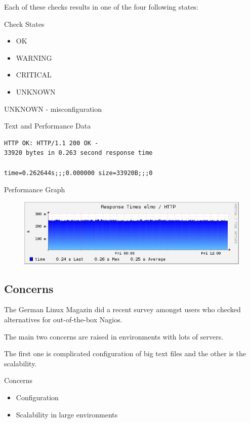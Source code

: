 Each of these checks results in one of the four
following states:

\begin{frame}[fragile]{Check States}

\begin{itemize}
\item OK
\item WARNING 
\item CRITICAL
\item UNKNOWN
\end{itemize}
\end{frame}

UNKNOWN - misconfiguration

\begin{frame}[fragile]{Text and Performance Data}
\begin{lstlisting}
HTTP OK: HTTP/1.1 200 OK -
33920 bytes in 0.263 second response time

time=0.262644s;;;0.000000 size=33920B;;;0
\end{lstlisting}
\end{frame}

\begin{frame}{Performance Graph}
\begin{figure}
\includegraphics[width=\textwidth]{images/perfdata.png}
\end{figure}
\end{frame}

\subsection{Concerns}

The German Linux Magazin did a recent survey amongst users
who checked alternatives for out-of-the-box Nagios.

The main two concerns are raised in environments with lots
of servers.

The first one is complicated configuration of big text files
and the other is the scalability.

\begin{frame}{Concerns}

\begin{itemize}
\item Configuration
\item Scalability in large environments
\end{itemize}
\end{frame}

